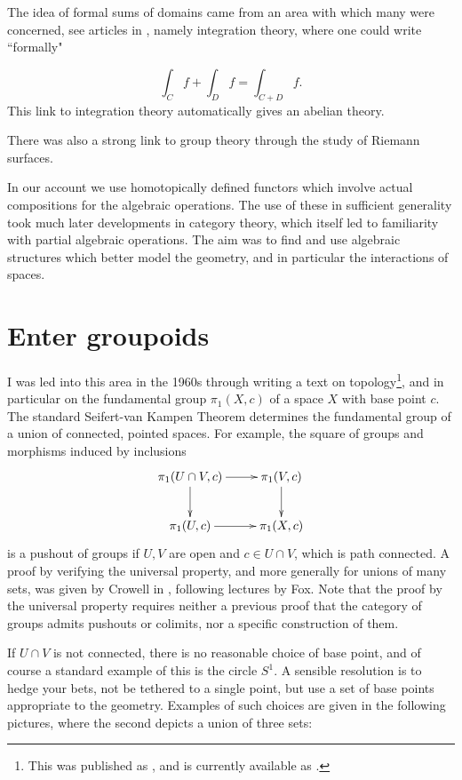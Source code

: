 \documentclass{elsarticle}
\begin{document}
The idea of formal sums of domains  came from an area with which many were concerned, see articles in \cite{jam},
namely integration theory, where one could write ``formally"

$$ \int _C f + \int _D f = \int_{C+D} f .$$
This link to integration theory automatically gives an abelian theory.

There was also a strong link to group theory through the study of Riemann surfaces.

In our account we use homotopically defined functors which involve actual compositions for the algebraic operations.  The use of
these in sufficient generality took much later developments in category theory, which itself led to familiarity with partial
algebraic operations. The aim was to find and use algebraic
structures which better model the geometry, and in particular the interactions of spaces.

\section{Enter groupoids}\label{sec:gpds}
I was led into this area in the 1960s through writing a text on topology\footnote{This was published as \cite{Brown-elements}, and is currently available as \cite{B2006}.}, and in particular on
the fundamental group $\pi_1 (X, c)$ of a space $X$ with base point $c$.  The standard Seifert-van Kampen Theorem  determines the fundamental group of a union of connected,  pointed
spaces. For example, the square of groups and morphisms induced by inclusions
\begin{equation} \vcenter{
\xymatrix{\pi_1(U \cap V,c) \ar [d] \ar [r] & \pi_1(V,c) \ar [d] \\
\pi_1(U,c) \ar [r] & \pi_1(X,c)}}
\end{equation}
is a pushout of groups if $U, V$   are open and $ c \in  U \cap V$, which is path connected.  A proof
by verifying the universal property, and more generally for unions of many sets, was given by
Crowell in \cite{Cr59}, following lectures by Fox. Note that the proof by the universal property  requires neither a previous proof that the category
of groups admits pushouts or colimits, nor  a specific construction of them.

If $U \cap V$   is not connected, there is no reasonable choice of base point, and of course a
standard example of this is the circle $S^ 1$.  A sensible resolution is to hedge your bets, not be
tethered to a single point, but use a set of base points appropriate to the geometry. Examples
of such choices are given in the following pictures, where the second depicts a union of three sets:
\end{document}
